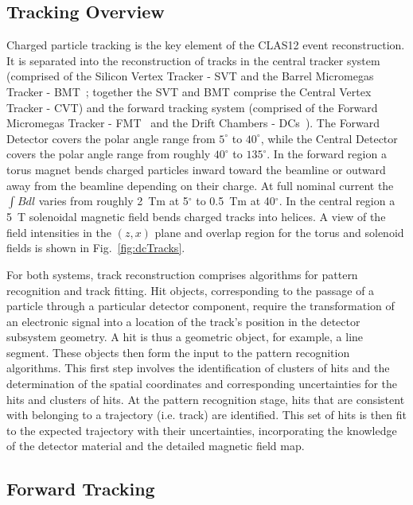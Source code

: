 \subsection{Tracking Overview}

Charged particle tracking is the key element of the CLAS12 event reconstruction. It is separated into the
reconstruction of tracks in the central tracker system (comprised of the Silicon Vertex Tracker - SVT
\cite{svt-nim} and the Barrel Micromegas Tracker - BMT~\cite{mm-nim}; together the SVT and BMT comprise
the Central Vertex Tracker - CVT)  and the forward tracking system (comprised of the Forward Micromegas
Tracker - FMT~\cite{mm-nim} and the Drift Chambers - DCs~\cite{dc-nim}). The Forward Detector covers the
polar angle range from $5^\circ$ to $40^\circ$, while the Central Detector covers the polar angle range from
roughly $40^\circ$ to $135^\circ$. In the forward region a torus magnet bends charged particles inward toward
the beamline or outward away from the beamline depending on their charge. At full nominal current the $\int B dl$
varies from roughly 2~Tm at 5$^\circ$ to 0.5~Tm at 40$^\circ$. In the central region a 5~T solenoidal magnetic
field bends charged tracks into helices. A view of the field intensities in the $(z,x)$ plane and overlap region for
the torus and solenoid fields is shown in Fig.~\ref{fig:dcTracks}.

For both systems, track reconstruction comprises algorithms for pattern recognition and track fitting. Hit objects,
corresponding to the passage of a particle through a particular detector component, require the transformation of
an electronic signal into a location of the track's position in the detector subsystem geometry. A hit is thus a
geometric object, for example, a line segment. These objects then form the input to the pattern recognition
algorithms. This first step involves the identification of clusters of hits and the determination of the spatial
coordinates and corresponding uncertainties for the hits and clusters of hits. At the pattern recognition stage, hits
that are consistent with belonging to a trajectory (i.e. track) are identified. This set of hits is then fit to the
expected trajectory with their uncertainties, incorporating the knowledge of the detector material and the
detailed magnetic field map.

\subsection{Forward Tracking}

